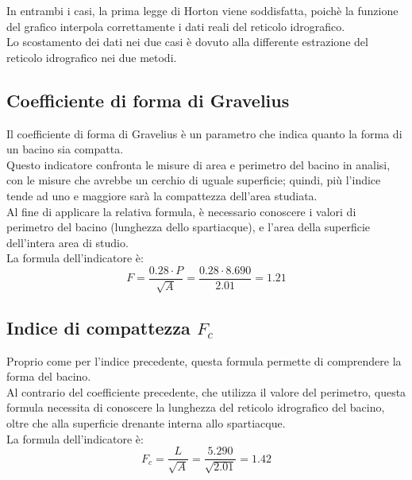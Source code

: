 \vspace{1cm}
In entrambi i casi, la prima legge di Horton viene soddisfatta, poichè la funzione del grafico interpola correttamente i dati reali del reticolo idrografico.\\
Lo scostamento dei dati nei due casi è dovuto alla differente estrazione del reticolo idrografico nei due metodi.

\subsection{Coefficiente di forma di Gravelius}
Il coefficiente di forma di Gravelius è un parametro che indica quanto la forma di un bacino sia compatta.\\
Questo indicatore confronta le misure di area e perimetro del bacino in analisi, con le misure che avrebbe un cerchio di uguale superficie; quindi, più l'indice tende ad uno e maggiore sarà la compattezza dell'area studiata.\\
Al fine di applicare la relativa formula, è necessario conoscere i valori di perimetro del bacino (lunghezza dello spartiacque), e l'area della superficie dell'intera area di studio.\\
La formula dell'indicatore è:
\begin{equation}
    F = \frac{0.28 \cdot P}{\sqrt{A}} = \frac{0.28 \cdot 8.690}{2.01} = 1.21
    \label{gravelius}
\end{equation}

\subsection{Indice di compattezza $F_c$}
Proprio come per l'indice precedente, questa formula permette di comprendere la forma del bacino.\\
Al contrario del coefficiente precedente, che utilizza il valore del perimetro, questa formula necessita di conoscere la lunghezza del reticolo idrografico del bacino, oltre che alla superficie drenante interna allo spartiacque.\\
La formula dell'indicatore è:
\begin{equation}
    F_c = \frac{L}{\sqrt{A}} = \frac{5.290}{\sqrt{2.01}} = 1.42
    \label{compatezza}
\end{equation}

